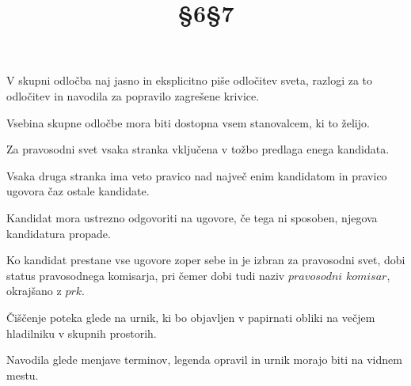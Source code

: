 \documentclass[a4paper]{article}
\begin{document}
\begin{center}
\large V skupni odločba naj jasno in eksplicitno piše odločitev sveta, razlogi za to odločitev in navodila za popravilo zagrešene krivice.

\large Vsebina skupne odločbe mora biti dostopna vsem stanovalcem, ki to želijo. 

\Large\title{§6}

\large Za pravosodni svet vsaka stranka vključena v tožbo predlaga enega kandidata.

\large Vsaka druga stranka ima veto pravico nad največ enim kandidatom in pravico ugovora čaz ostale kandidate.

\large Kandidat mora ustrezno odgovoriti na ugovore, če tega ni sposoben, njegova kandidatura propade.

\large Ko kandidat prestane vse ugovore zoper sebe in je izbran za pravosodni svet, dobi status pravosodnega komisarja, pri čemer dobi tudi naziv $pravosodni$ $komisar$, okrajšano z $prk$.

\Large\title{§7}

\large Čiščenje poteka glede na urnik, ki bo objavljen v papirnati obliki na večjem hladilniku v skupnih prostorih.

\large Navodila glede menjave terminov, legenda opravil in urnik morajo biti na vidnem mestu.


\end{center}
\end{document}
